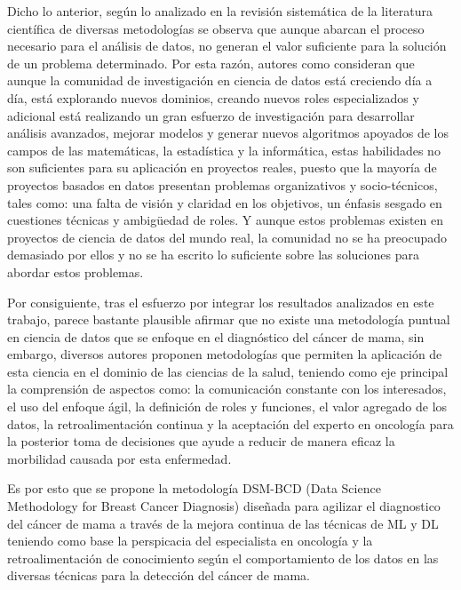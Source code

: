 Dicho lo anterior, según lo analizado en la revisión sistemática de la literatura científica de diversas metodologías se observa que aunque abarcan el proceso necesario para el análisis de datos, no generan el valor suficiente para la solución de un problema determinado. Por esta razón, autores como \cite{Martinez2021} consideran que aunque la comunidad de investigación en ciencia de datos está creciendo día a día, está explorando nuevos dominios, creando nuevos roles especializados y adicional está realizando un gran esfuerzo de investigación para desarrollar análisis avanzados, mejorar modelos y generar nuevos algoritmos apoyados de los campos de las matemáticas, la estadística y la informática, estas habilidades no son suficientes para su aplicación en proyectos reales, puesto que la mayoría de proyectos basados en datos presentan problemas organizativos y socio-técnicos, tales como: una falta de visión y claridad en los objetivos, un énfasis sesgado en cuestiones técnicas y ambigüedad de roles. Y aunque estos problemas existen en proyectos de ciencia de datos del mundo real, la comunidad no se ha preocupado demasiado por ellos y no se ha escrito lo suficiente sobre las soluciones para abordar estos problemas.

\newpage
Por consiguiente, tras el esfuerzo por integrar los resultados analizados en este trabajo, parece bastante plausible afirmar que no existe una metodología puntual en ciencia de datos que se enfoque en el diagnóstico del cáncer de mama, sin embargo, diversos autores proponen metodologías que permiten la aplicación de esta ciencia en el dominio de las ciencias de la salud, teniendo como eje principal la comprensión de aspectos como: la comunicación constante con los interesados, el uso del enfoque ágil, la definición de roles y funciones, el valor agregado de los datos, la retroalimentación continua y la aceptación del experto en oncología para la posterior toma de decisiones que ayude a reducir de manera eficaz la morbilidad causada por esta enfermedad. 

Es por esto que se propone la metodología DSM-BCD (Data Science Methodology for Breast Cancer Diagnosis) diseñada para agilizar el diagnostico del cáncer de mama a través de la mejora continua de las técnicas de ML y DL teniendo como base la perspicacia del especialista en oncología y la retroalimentación  de conocimiento según el comportamiento de los datos en las diversas técnicas para la detección del cáncer de mama.